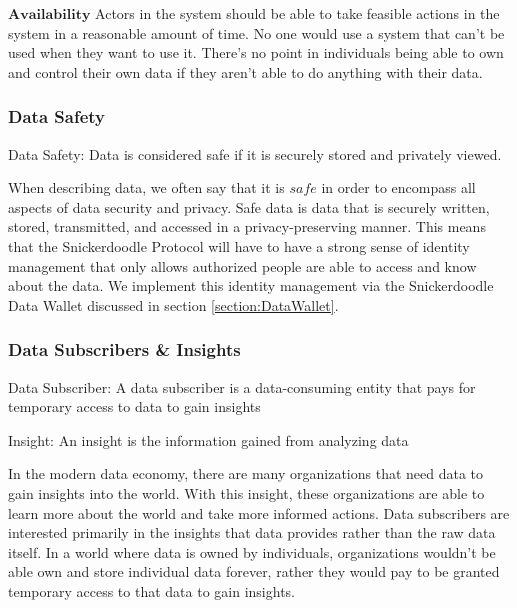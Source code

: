 $\mathbf{Availability}$
Actors in the system should be able to take feasible actions in the system in a reasonable amount of time. No one would use a system that can't be used when they want to use it. There's no point in individuals being able to own and control their own data if they aren't able to do anything with their data. 

\subsubsection{Data Safety}
\begin{definition}
\label{definition:DataSafety}
Data Safety: Data is considered safe if it is securely stored and privately viewed.
\end{definition}

When describing data, we often say that it is $\textit{safe}$ in order to encompass all aspects of data security and privacy. Safe data is data that is securely written, stored, transmitted, and accessed in a privacy-preserving manner. This means that the Snickerdoodle Protocol will have to have a strong sense of identity management that only allows authorized people are able to access and know about the data. We implement this identity management via the Snickerdoodle Data Wallet discussed in section \ref{section:DataWallet}. 

\subsubsection{Data Subscribers \& Insights}
\begin{definition}
\label{definition:DataSubscriber}
Data Subscriber: A data subscriber is a data-consuming entity that pays for temporary access to data to gain insights
\end{definition}
\begin{definition}
\label{definition:Insight}
Insight: An insight is the information gained from analyzing data
\end{definition}
In the modern data economy, there are many organizations that need data to gain insights into the world. With this insight, these organizations are able to learn more about the world and take more informed actions. Data subscribers are interested primarily in the insights that data provides rather than the raw data itself. In a world where data is owned by individuals, organizations wouldn't be able own and store individual data forever, rather they would pay to be granted temporary access to that data to gain insights.


